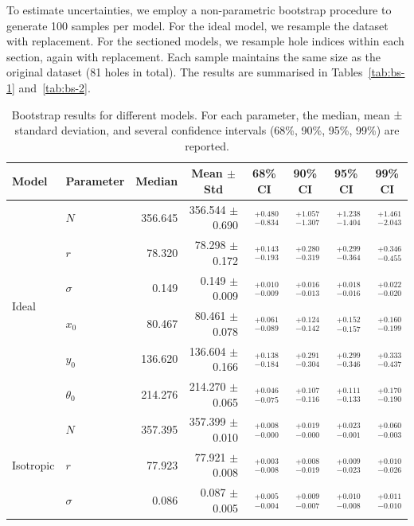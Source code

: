 \documentclass[11pt]{article}
\begin{document}
To estimate uncertainties, we employ a non-parametric bootstrap procedure to generate 100 samples per model. For the ideal model, we resample the dataset with replacement. For the sectioned models, we resample hole indices within each section, again with replacement. Each sample maintains the same size as the original dataset (81 holes in total). The results are summarised in Tables~\ref{tab:bs-1} and~\ref{tab:bs-2}.




\begin{table}[ht]
\centering
\caption{Bootstrap results for different models. For each parameter, the median, mean ± standard deviation, and several confidence intervals (68\%, 90\%, 95\%, 99\%) are reported.}
\begin{tabular}{llrrrrrr}
\toprule
Model & Parameter & \multicolumn{1}{c}{Median} & \multicolumn{1}{c}{Mean $\pm$ Std} & \multicolumn{1}{c}{68\% CI} & \multicolumn{1}{c}{90\% CI} & \multicolumn{1}{c}{95\% CI} & \multicolumn{1}{c}{99\% CI} \\
\midrule
\multirow{6}{*}{Ideal} & $N$ & 356.645 & 356.544 $\pm$ 0.690 & $^{+0.480}_{-0.834}$ & $^{+1.057}_{-1.307}$ & $^{+1.238}_{-1.404}$ & $^{+1.461}_{-2.043}$ \\
 & $r$ & 78.320 & 78.298 $\pm$ 0.172 & $^{+0.143}_{-0.193}$ & $^{+0.280}_{-0.319}$ & $^{+0.299}_{-0.364}$ & $^{+0.346}_{-0.455}$ \\
 & $\sigma$ & 0.149 & 0.149 $\pm$ 0.009 & $^{+0.010}_{-0.009}$ & $^{+0.016}_{-0.013}$ & $^{+0.018}_{-0.016}$ & $^{+0.022}_{-0.020}$ \\
 & $x_0$ & 80.467 & 80.461 $\pm$ 0.078 & $^{+0.061}_{-0.089}$ & $^{+0.124}_{-0.142}$ & $^{+0.152}_{-0.157}$ & $^{+0.160}_{-0.199}$ \\
 & $y_0$ & 136.620 & 136.604 $\pm$ 0.166 & $^{+0.138}_{-0.184}$ & $^{+0.291}_{-0.304}$ & $^{+0.299}_{-0.346}$ & $^{+0.333}_{-0.437}$ \\
 & $\theta_0$ & 214.276 & 214.270 $\pm$ 0.065 & $^{+0.046}_{-0.075}$ & $^{+0.107}_{-0.116}$ & $^{+0.111}_{-0.133}$ & $^{+0.170}_{-0.190}$ \\
\midrule
\multirow{3}{*}{Isotropic} & $N$ & 357.395 & 357.399 $\pm$ 0.010 & $^{+0.008}_{-0.000}$ & $^{+0.019}_{-0.000}$ & $^{+0.023}_{-0.001}$ & $^{+0.060}_{-0.003}$ \\
 & $r$ & 77.923 & 77.921 $\pm$ 0.008 & $^{+0.003}_{-0.008}$ & $^{+0.008}_{-0.019}$ & $^{+0.009}_{-0.023}$ & $^{+0.010}_{-0.026}$ \\
 & $\sigma$ & 0.086 & 0.087 $\pm$ 0.005 & $^{+0.005}_{-0.004}$ & $^{+0.009}_{-0.007}$ & $^{+0.010}_{-0.008}$ & $^{+0.011}_{-0.010}$ \\

\end{tabular}
\end{table}
\end{document}
